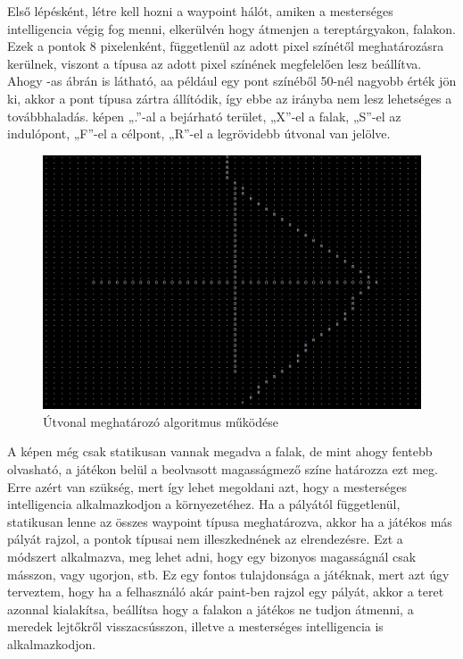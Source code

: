 Első lépésként, létre kell hozni a waypoint hálót, amiken a mesterséges intelligencia végig fog menni, elkerülvén hogy átmenjen a tereptárgyakon, falakon. Ezek a pontok 8 pixelenként, függetlenül az adott pixel színétől meghatározásra kerülnek, viszont a típusa az adott pixel színének megfelelően lesz beállítva. Ahogy -as ábrán is látható, aa például egy pont színéből 50-nél nagyobb érték jön ki, akkor a pont típusa zártra állítódik, így ebbe az irányba nem lesz lehetséges a továbbhaladás.   képen „.”-al a bejárható terület, „X”-el a falak, „S”-el az indulópont, „F”-el a célpont, „R”-el a legrövidebb útvonal van jelölve.

\begin{figure}[h]
\centering
\includegraphics[scale=0.15]{kepek/mi_printscreen.png}
\caption{Útvonal meghatározó algoritmus működése}
\label{fig:mi_printscreen}
\end{figure}


A képen még csak statikusan vannak megadva a falak, de mint ahogy fentebb olvasható, a játékon belül a beolvasott magasságmező színe határozza ezt meg. Erre azért van szükség, mert így lehet megoldani azt, hogy a mesterséges intelligencia alkalmazkodjon a környezetéhez. Ha a pályától függetlenül, statikusan lenne az összes waypoint típusa meghatározva, akkor ha a játékos más pályát rajzol, a pontok típusai nem illeszkednének az elrendezésre. Ezt a módszert alkalmazva, meg lehet adni, hogy egy bizonyos magasságnál csak másszon, vagy ugorjon, stb. Ez egy fontos tulajdonsága a játéknak, mert azt úgy terveztem, hogy ha a felhasználó akár paint-ben rajzol egy pályát, akkor a teret azonnal kialakítsa, beállítsa hogy a falakon a játékos ne tudjon átmenni, a meredek lejtőkről visszacsússzon, illetve a mesterséges intelligencia is alkalmazkodjon.

